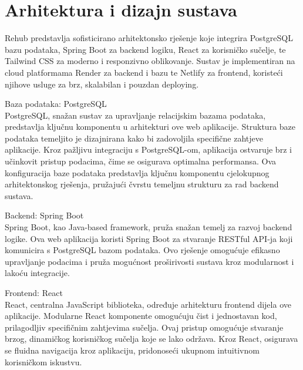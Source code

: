 \chapter{Arhitektura i dizajn sustava}
		
        Rehub predstavlja sofisticirano arhitektonsko rješenje koje integrira PostgreSQL bazu podataka, Spring Boot za backend logiku, React za korisničko sučelje, te Tailwind CSS za moderno i responzivno oblikovanje. Sustav je implementiran na cloud platformama Render za backend i bazu te Netlify za frontend, koristeći njihove usluge za brz, skalabilan i pouzdan deploying.\\

            \begin{packed_item}
                \large \item Baza podataka: PostgreSQL \normalsize \\
                    PostgreSQL, snažan sustav za upravljanje relacijskim bazama podataka, predstavlja ključnu komponentu u arhitekturi ove web aplikacije. Struktura baze podataka temeljito je dizajnirana kako bi zadovoljila specifične zahtjeve aplikacije. Kroz pažljivu integraciju s PostgreSQL-om, aplikacija ostvaruje brz i učinkovit pristup podacima, čime se osigurava optimalna performansa. Ova konfiguracija baze podataka predstavlja ključnu komponentu cjelokupnog arhitektonskog rješenja, pružajući čvrstu temeljnu strukturu za rad backend sustava. \\
                \large \item Backend: Spring Boot \normalsize \\
                    Spring Boot, kao Java-based framework, pruža snažan temelj za razvoj backend logike. Ova web aplikacija koristi Spring Boot za stvaranje RESTful API-ja koji komunicira s PostgreSQL bazom podataka. Ovo rješenje omogućuje efikasno upravljanje podacima i pruža mogućnost proširivosti sustava kroz modularnost i lakoću integracije. \\
                \large \item Frontend: React \normalsize \\
                    React, centralna JavaScript biblioteka, određuje arhitekturu frontend dijela ove aplikacije. Modularne React komponente omogućuju čist i jednostavan kod, prilagodljiv specifičnim zahtjevima sučelja. Ovaj pristup omogućuje stvaranje brzog, dinamičkog korisničkog sučelja koje se lako održava. Kroz React, osigurava se fluidna navigacija kroz aplikaciju, pridonoseći ukupnom intuitivnom korisničkom iskustvu. \\

\end{packed_item}
